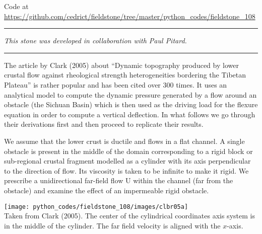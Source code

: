 


\begin{center}
Code at \url{https://github.com/cedrict/fieldstone/tree/master/python_codes/fieldstone_108}
\end{center}

\par\noindent\rule{\textwidth}{0.4pt}

{\sl This stone was developed in collaboration with Paul Pitard.} 

\par\noindent\rule{\textwidth}{0.4pt}


The article by Clark \etal (2005) \cite{clbr05} about ``Dynamic topography produced by lower crustal 
flow against rheological strength heterogeneities bordering the Tibetan Plateau'' 
is rather popular and has been cited over 300 times. It uses an analytical model to compute the 
dynamic pressure generated by a flow around an obstacle (the Sichuan Basin) which is then 
used as the driving load for the flexure equation in 
order to compute a vertical deflection. In what follows we go through their derivations first and 
then proceed to replicate their results.  

We assume that the lower crust is ductile and flows in a flat channel. A single obstacle is present in 
the middle of the domain corresponding to a rigid block or sub-regional crustal fragment modelled as 
a cylinder with its axis perpendicular to the direction of flow.
Its viscosity is taken to be infinite to make it rigid. 
We prescribe a unidirectional far-field flow U within the channel (far from the obstacle) 
and examine the effect of an impermeable rigid obstacle. 

\begin{center}
\texttt{[image: python\_codes/fieldstone\_108/images/clbr05a]}\\
{\captionfont 
Taken from Clark \etal (2005). The center of the cylindrical coordinates axis system is in the middle of the cylinder.  
The far field velocity is aligned with the $x$-axis.}
\end{center}

